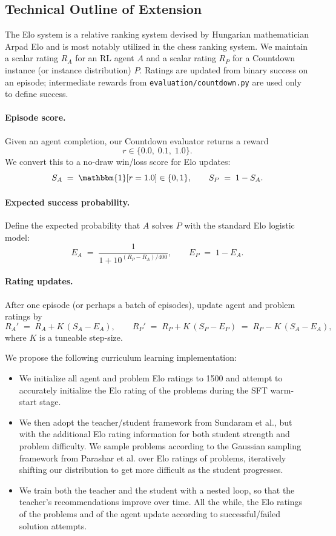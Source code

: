 \documentclass[11pt]{article}
\begin{document}
\subsection{Technical Outline of Extension}

The Elo system is a relative ranking system devised by Hungarian mathematician Arpad Elo and is most notably utilized in the chess ranking system. 
We maintain a scalar rating $R_A$ for an RL agent $A$ and a scalar rating $R_P$ for a Countdown instance (or instance distribution) $P$. Ratings are updated from binary success on an episode; intermediate rewards from \texttt{evaluation/countdown.py} are used only to define success.

\paragraph{Episode score.}
Given an agent completion, our Countdown evaluator returns a reward
\[
r \in \{0.0,\;0.1,\;1.0\}.
\]
We convert this to a no-draw win/loss score for Elo updates:
\[
S_A \;=\; \mathbbm{1}[r = 1.0] \in \{0,1\}, 
\qquad
S_P \;=\; 1 - S_A.
\]

\paragraph{Expected success probability.}
Define the expected probability that $A$ solves $P$ with the standard Elo logistic model:
\[
E_A \;=\; \frac{1}{1 + 10^{(R_P - R_A)/400}},
\qquad
E_P \;=\; 1 - E_A.
\]

\paragraph{Rating updates.}
After one episode (or perhaps a batch of episodes), update agent and problem ratings by
\[
R_A' \;=\; R_A + K\,(S_A - E_A),
\qquad
R_P' \;=\; R_P + K\,(S_P - E_P)
      \;=\; R_P - K\,(S_A - E_A),
\]
where $K$ is a tuneable step-size.


We propose the following curriculum learning implementation:
\begin{itemize}
\item We initialize all agent and problem Elo ratings to 1500 and attempt to accurately initialize the Elo rating of the problems during the SFT warm-start stage.
\item We then adopt the teacher/student framework from Sundaram et al., but with the additional Elo rating information for both student strength and problem difficulty. We sample problems according to the Gaussian sampling framework from Parashar et al. over Elo ratings of problems, iteratively shifting our distribution to get more difficult as the student progresses.
\item We train both the teacher and the student with a nested loop, so that the teacher's recommendations improve over time. All the while, the Elo ratings of the problems and of the agent update according to successful/failed solution attempts.
\end{itemize}
\end{document}
